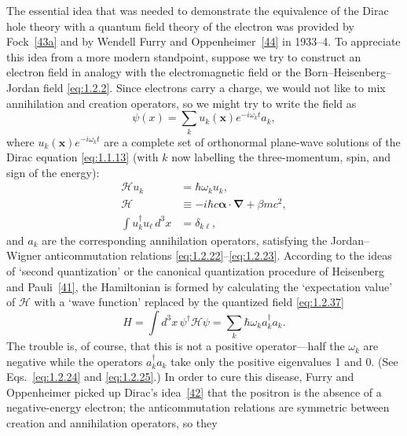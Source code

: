 The essential idea that was needed to demonstrate the equivalence of the
Dirac hole theory with a quantum field theory of the electron was provided by
Fock~\hyperref[ref:1.43a]{[43a]} and by Wendell Furry and Oppenheimer~\hyperref[ref:1.44]{[44]} in 1933--4. To
appreciate this idea from a more modern standpoint, suppose we try to
construct an electron field in analogy with the electromagnetic field or the
Born--Heisenberg--Jordan field \eqref{eq:1.2.2}. Since electrons carry a charge, we
would not like to mix annihilation and creation operators, so we might try to
write the field as
\begin{equation}
  \psi(x)=\sum_k u_k(\mathbf x)e^{-i\omega_kt}a_k,
  \tag{1.2.37}\label{eq:1.2.37}
\end{equation}
where $u_k(\mathbf x)e^{-i\omega_kt}$ are a complete set of orthonormal
plane-wave solutions of the Dirac equation \eqref{eq:1.1.13} (with $k$ now labelling
the three-momentum, spin, and sign of the energy):
\begin{align}
  \mathcal H u_k&=\hbar\omega_ku_k,
  \tag{1.2.38}\label{eq:1.2.38}\\
  \mathcal H&\equiv-i\hbar c\boldsymbol\alpha\cdot\boldsymbol\nabla
    +\beta mc^2,
  \tag{1.2.39}\label{eq:1.2.39}\\
  \int u_k^{\dagger}u_{\ell}\,d^3x&=\delta_{k\ell},
  \tag{1.2.40}\label{eq:1.2.40}
\end{align}
and $a_k$ are the corresponding annihilation operators, satisfying the
Jordan--Wigner anticommutation relations \eqref{eq:1.2.22}--\eqref{eq:1.2.23}. According to the
ideas of `second quantization' or the canonical quantization procedure of
Heisenberg and Pauli~\hyperref[ref:1.41]{[41]}, the Hamiltonian is formed by calculating the
`expectation value' of $\mathcal H$ with a `wave function' replaced by the
quantized field \eqref{eq:1.2.37}
\begin{equation}
  H=\int d^3x\,\psi^{\dagger}\mathcal H\psi
   =\sum_k\hbar\omega_ka_k^{\dagger}a_k.
  \tag{1.2.41}\label{eq:1.2.41}
\end{equation}
The trouble is, of course, that this is not a positive operator---half the
$\omega_k$ are negative while the operators $a_k^{\dagger}a_k$ take only the
positive eigenvalues 1 and 0. (See Eqs.~\eqref{eq:1.2.24} and \eqref{eq:1.2.25}.) In order to
cure this disease, Furry and Oppenheimer picked up Dirac's idea~\hyperref[ref:1.42]{[42]} that the
positron is the absence of a negative-energy electron; the anticommutation
relations are symmetric between creation and annihilation operators, so they
